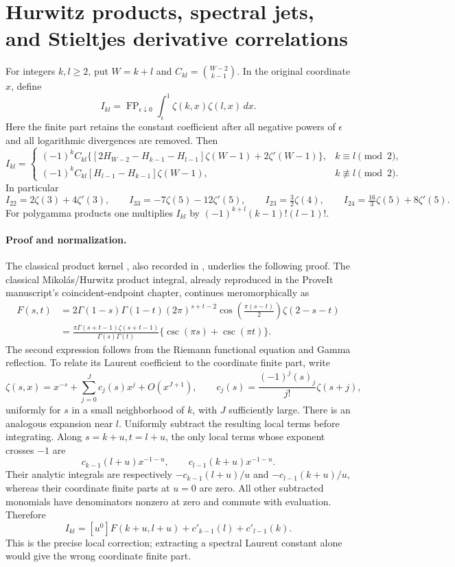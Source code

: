 \section[Hurwitz products, spectral jets, and Stieltjes derivative correlations]{Hurwitz products, spectral jets,\\and Stieltjes derivative correlations}
\label{hprod:sec}

For integers $k,l\ge2$, put $W=k+l$ and
$C_{kl}=\binom{W-2}{k-1}$.  In the original coordinate $x$, define
\[
 I_{kl}=\operatorname{FP}_{\epsilon\downarrow0}
 \int_\epsilon^1\zeta(k,x)\zeta(l,x)\,dx.
\]
Here the finite part retains the constant coefficient after all negative
powers of $\epsilon$ and all logarithmic divergences are removed.
Then
\[
 I_{kl}=
 \begin{cases}
 (-1)^kC_{kl}\bigl\{[2H_{W-2}-H_{k-1}-H_{l-1}]\zeta(W-1)
                    +2\zeta'(W-1)\bigr\},&k\equiv l\pmod2,\\[3pt]
 (-1)^kC_{kl}[H_{l-1}-H_{k-1}]\zeta(W-1),&k\not\equiv l\pmod2.
 \end{cases}
\]
In particular
\[
 I_{22}=2\zeta(3)+4\zeta'(3),\qquad
 I_{33}=-7\zeta(5)-12\zeta'(5),\qquad
 I_{23}=\tfrac32\zeta(4),\qquad
 I_{24}=\tfrac{16}{3}\zeta(5)+8\zeta'(5).
\]
For polygamma products one multiplies $I_{kl}$ by
$(-1)^{k+l}(k-1)!(l-1)!$.

\paragraph{Proof and normalization.}
The classical product kernel \cite[Remark~1]{Shpot2016}, also recorded in \cite[Chapter~7]{SourceManuscript}, underlies the following proof.
The classical Mikol\'as/Hurwitz product integral, already reproduced
in the ProveIt manuscript's coincident-endpoint chapter, continues
meromorphically as
\begin{align*}
 F(s,t)&=2\Gamma(1-s)\Gamma(1-t)(2\pi)^{s+t-2}
 \cos\!\left(\frac{\pi(s-t)}2\right)\zeta(2-s-t)\\
 &=\frac{\pi\Gamma(s+t-1)\zeta(s+t-1)}{\Gamma(s)\Gamma(t)}
   \{\csc(\pi s)+\csc(\pi t)\}.
\end{align*}
The second expression follows from the Riemann functional equation and
Gamma reflection.  To relate its Laurent coefficient to the coordinate
finite part, write
\[
 \zeta(s,x)=x^{-s}+\sum_{j=0}^{J}c_j(s)x^j+O(x^{J+1}),
 \qquad c_j(s)=\frac{(-1)^j(s)_j}{j!}\zeta(s+j),
\]
uniformly for $s$ in a small neighborhood of $k$, with $J$ sufficiently
large.  There is an analogous expansion near $l$.  Uniformly subtract
the resulting local terms before integrating.  Along
$s=k+u,t=l+u$, the only local terms whose exponent crosses $-1$ are
\[
 c_{k-1}(l+u)x^{-1-u},\qquad
 c_{l-1}(k+u)x^{-1-u}.
\]
Their analytic integrals are respectively
$-c_{k-1}(l+u)/u$ and $-c_{l-1}(k+u)/u$, whereas their coordinate
finite parts at $u=0$ are zero.  All other subtracted monomials have
denominators nonzero at zero and commute with evaluation.  Therefore
\[
 I_{kl}=[u^0]F(k+u,l+u)
       +c'_{k-1}(l)+c'_{l-1}(k).
\]
This is the precise local correction; extracting a spectral Laurent
constant alone would give the wrong coordinate finite part.

